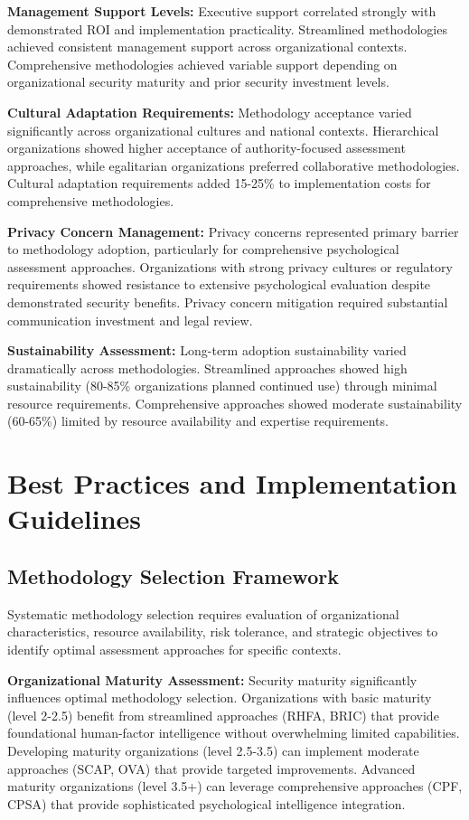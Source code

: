 \documentclass[10pt, twocolumn]{article}
\begin{document}
\textbf{Management Support Levels:} Executive support correlated strongly with demonstrated ROI and implementation practicality. Streamlined methodologies achieved consistent management support across organizational contexts. Comprehensive methodologies achieved variable support depending on organizational security maturity and prior security investment levels.

\textbf{Cultural Adaptation Requirements:} Methodology acceptance varied significantly across organizational cultures and national contexts. Hierarchical organizations showed higher acceptance of authority-focused assessment approaches, while egalitarian organizations preferred collaborative methodologies. Cultural adaptation requirements added 15-25\% to implementation costs for comprehensive methodologies.

\textbf{Privacy Concern Management:} Privacy concerns represented primary barrier to methodology adoption, particularly for comprehensive psychological assessment approaches. Organizations with strong privacy cultures or regulatory requirements showed resistance to extensive psychological evaluation despite demonstrated security benefits. Privacy concern mitigation required substantial communication investment and legal review.

\textbf{Sustainability Assessment:} Long-term adoption sustainability varied dramatically across methodologies. Streamlined approaches showed high sustainability (80-85\% organizations planned continued use) through minimal resource requirements. Comprehensive approaches showed moderate sustainability (60-65\%) limited by resource availability and expertise requirements.

\section{Best Practices and Implementation Guidelines}

\subsection{Methodology Selection Framework}

Systematic methodology selection requires evaluation of organizational characteristics, resource availability, risk tolerance, and strategic objectives to identify optimal assessment approaches for specific contexts.

\textbf{Organizational Maturity Assessment:} Security maturity significantly influences optimal methodology selection. Organizations with basic maturity (level 2-2.5) benefit from streamlined approaches (RHFA, BRIC) that provide foundational human-factor intelligence without overwhelming limited capabilities. Developing maturity organizations (level 2.5-3.5) can implement moderate approaches (SCAP, OVA) that provide targeted improvements. Advanced maturity organizations (level 3.5+) can leverage comprehensive approaches (CPF, CPSA) that provide sophisticated psychological intelligence integration.
\end{document}
